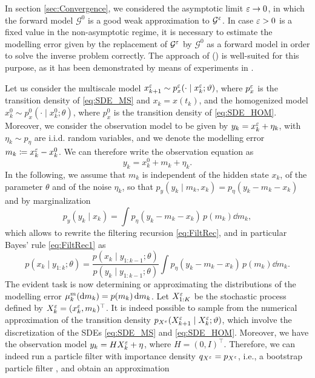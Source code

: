 \documentclass[10pt]{article}
\begin{document}
In section \ref{sec:Convergence}, we considered the asymptotic limit $\varepsilon \to 0$, in which the forward model $\mathcal G^0$ is a good weak approximation to $\mathcal G^\varepsilon$. In case $\varepsilon > 0$ is a fixed value in the non-asymptotic regime, it is necessary to estimate the modelling error given by the replacement of $\mathcal G^\varepsilon$ by $\mathcal G^0$ as a forward model in order to solve the inverse problem correctly. The approach of \cite{CDS18} () is well-suited for this purpose, as it has been demonstrated by means of experiments in \cite{AbD18}. 

Let us consider the multiscale model $x^\varepsilon_{k+1} \sim p^\varepsilon_x(\cdot \mid x^\varepsilon_k; \vartheta)$, where $p_x^\varepsilon$ is the transition density of \eqref{eq:SDE_MS} and $x_k = x(t_k)$, and the homogenized model $x^0_k \sim p^0_x(\cdot \mid x^0_k; \theta)$, where $p^0_x$ is the transition density of \eqref{eq:SDE_HOM}. Moreover, we consider the observation model to be given by $y_k = x^\varepsilon_k + \eta_k$, with $\eta_k \sim p_\eta$ are i.i.d. random variables, and we denote the modelling error $m_k \coloneqq x^\varepsilon_k - x^0_k$. We can therefore write the observation equation as
\begin{equation}
	y_k = x^0_k + m_k + \eta_k.
\end{equation}
In the following, we assume that $m_k$ is independent of the hidden state $x_k$, of the parameter $\theta$ and of the noise $\eta_k$, so that $p_y(y_k \mid m_k, x_k) = p_\eta(y_k - m_k - x_k)$ and by marginalization
\begin{equation}
	p_y(y_k \mid x_k) = \int p_\eta(y_k - m_k - x_k) \, p(m_k) \dd m_k,
\end{equation}
which allows to rewrite the filtering recursion \eqref{eq:FiltRec}, and in particular Bayes' rule \eqref{eq:FiltRec1} as
\begin{equation}\label{eq:ModelingErrorPF}
	p(x_k \mid y_{1:k}; \theta) = \frac{p(x_k \mid y_{1:k-1}; \theta)}{p(y_k \mid y_{1:k-1}; \theta)}\int p_\eta(y_k - m_k - x_k) \, p(m_k) \dd m_k.
\end{equation}
The evident task is now determining or approximating the distributions of the modelling error $\mu^m_k(\mathrm{d} m_k) = p(m_k) \,\mathrm{d} m_k$. Let $X^\varepsilon_{1:K}$ be the stochastic process defined by $X^\varepsilon_k = (x^\varepsilon_k , m_k)^\top$. It is indeed possible to sample from the numerical approximation of the transition density $p_{X^\varepsilon}(X^\varepsilon_{k+1} \mid X^\varepsilon_k; \vartheta)$, which involve the discretization of the SDEs \eqref{eq:SDE_MS} and \eqref{eq:SDE_HOM}. Moreover, we have the observation model $y_k = HX^\varepsilon_k + \eta$, where $H = (0, I)^\top$. Therefore, we can indeed run a particle filter with importance density $q_{X^\varepsilon} = p_{X^\varepsilon}$, i.e., a bootstrap particle filter \cite{GSS93}, and obtain an approximation
\end{document}
